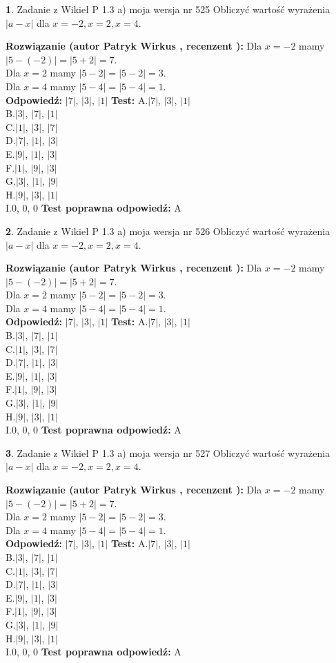 \documentclass[12pt, a4paper]{article}
\theoremstyle{definition} %
\newtheorem{zad}{}
\newcommand{\zadStart}[1]{\begin{zad}#1\newline}
\newcommand{\zadStop}{\end{zad}}
\newcommand{\rozwStart}[2]{\noindent \textbf{Rozwiązanie (autor #1 , recenzent #2): }\newline}
\newcommand{\rozwStop}{\newline}
\newcommand{\odpStart}{\noindent \textbf{Odpowiedź:}\newline}
\newcommand{\odpStop}{\newline}
\newcommand{\testStart}{\noindent \textbf{Test:}\newline}
\newcommand{\testStop}{\newline}
\newcommand{\kluczStart}{\noindent \textbf{Test poprawna odpowiedź:}\newline}
\newcommand{\kluczStop}{\newline}
\begin{document}
\zadStart{Zadanie z Wikieł P 1.3 a) moja wersja nr 525}
Obliczyć wartość wyrażenia $|a - x|$ dla $x=-2,x=2,x=4$.
\zadStop
\rozwStart{Patryk Wirkus}{}
Dla $x = -2$ mamy $|5 - (-2)| = |5 + 2| = 7$.\\
Dla $x = 2$ mamy $|5 - 2| = |5 - 2| = 3$.\\
Dla $x = 4$ mamy $|5 - 4| = |5 - 4| = 1$.\\
\rozwStop
\odpStart
$|7|$, $|3|$, $|1|$
\odpStop
\testStart
A.$|7|$, $|3|$, $|1|$\\
B.$|3|$, $|7|$, $|1|$\\
C.$|1|$, $|3|$, $|7|$\\
D.$|7|$, $|1|$, $|3|$\\
E.$|9|$, $|1|$, $|3|$\\
F.$|1|$, $|9|$, $|3|$\\
G.$|3|$, $|1|$, $|9|$\\
H.$|9|$, $|3|$, $|1|$\\
I.$0$, $0$, $0$
\testStop
\kluczStart
A
\kluczStop



\zadStart{Zadanie z Wikieł P 1.3 a) moja wersja nr 526}
Obliczyć wartość wyrażenia $|a - x|$ dla $x=-2,x=2,x=4$.
\zadStop
\rozwStart{Patryk Wirkus}{}
Dla $x = -2$ mamy $|5 - (-2)| = |5 + 2| = 7$.\\
Dla $x = 2$ mamy $|5 - 2| = |5 - 2| = 3$.\\
Dla $x = 4$ mamy $|5 - 4| = |5 - 4| = 1$.\\
\rozwStop
\odpStart
$|7|$, $|3|$, $|1|$
\odpStop
\testStart
A.$|7|$, $|3|$, $|1|$\\
B.$|3|$, $|7|$, $|1|$\\
C.$|1|$, $|3|$, $|7|$\\
D.$|7|$, $|1|$, $|3|$\\
E.$|9|$, $|1|$, $|3|$\\
F.$|1|$, $|9|$, $|3|$\\
G.$|3|$, $|1|$, $|9|$\\
H.$|9|$, $|3|$, $|1|$\\
I.$0$, $0$, $0$
\testStop
\kluczStart
A
\kluczStop



\zadStart{Zadanie z Wikieł P 1.3 a) moja wersja nr 527}
Obliczyć wartość wyrażenia $|a - x|$ dla $x=-2,x=2,x=4$.
\zadStop
\rozwStart{Patryk Wirkus}{}
Dla $x = -2$ mamy $|5 - (-2)| = |5 + 2| = 7$.\\
Dla $x = 2$ mamy $|5 - 2| = |5 - 2| = 3$.\\
Dla $x = 4$ mamy $|5 - 4| = |5 - 4| = 1$.\\
\rozwStop
\odpStart
$|7|$, $|3|$, $|1|$
\odpStop
\testStart
A.$|7|$, $|3|$, $|1|$\\
B.$|3|$, $|7|$, $|1|$\\
C.$|1|$, $|3|$, $|7|$\\
D.$|7|$, $|1|$, $|3|$\\
E.$|9|$, $|1|$, $|3|$\\
F.$|1|$, $|9|$, $|3|$\\
G.$|3|$, $|1|$, $|9|$\\
H.$|9|$, $|3|$, $|1|$\\
I.$0$, $0$, $0$
\testStop
\kluczStart
A
\kluczStop
\end{document}
